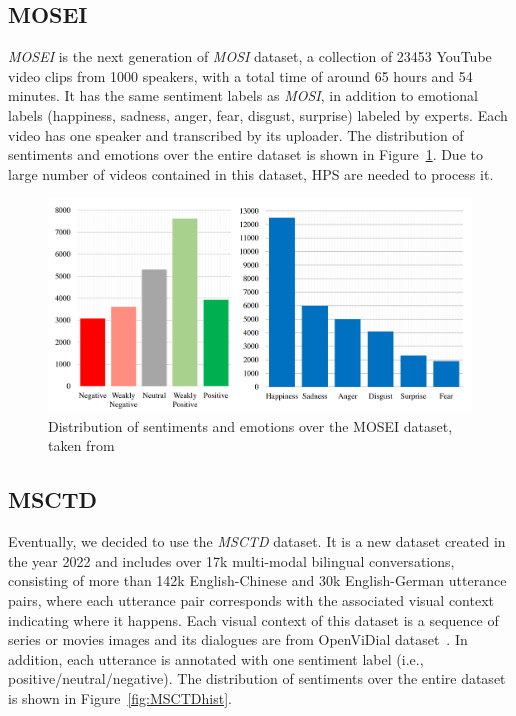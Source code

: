 \subsection{MOSEI}
\textit{MOSEI} is the next generation of \textit{MOSI} dataset, a collection of 23453 YouTube video clips from 1000 speakers, with a total time of around 65 hours and 54 minutes. It has the same sentiment labels as \textit{MOSI}, in addition to emotional labels (happiness, sadness, anger, fear, disgust, surprise) labeled by experts. Each video has one speaker and transcribed by its uploader. The distribution of sentiments and emotions over the entire dataset is shown in Figure~\ref{fig:MOSEIhists}. Due to large number of videos contained in this dataset, HPS are needed to process it.

\begin{figure}[t]
	\centering
	\includegraphics[width=\linewidth]{fig/MOSEIhists}
	\caption{Distribution of sentiments and emotions over the MOSEI dataset, taken from~\cite{zadeh2018multimodal}}
	\label{fig:MOSEIhists}
\end{figure}

\subsection{MSCTD}
Eventually, we decided to use the \textit{MSCTD} dataset. It is a new dataset created in the year 2022 and includes over 17k multi-modal bilingual conversations, consisting of more than 142k English-Chinese and 30k English-German utterance pairs, where each utterance pair corresponds with the associated visual context indicating where it happens. Each visual context of this dataset is a sequence of series or movies images and its dialogues are from OpenViDial dataset~\cite{meng2020openvidial}. In addition, each utterance is annotated with one sentiment label (i.e., positive/neutral/negative). The distribution of sentiments over the entire dataset is shown in Figure~\ref{fig:MSCTDhist}.
